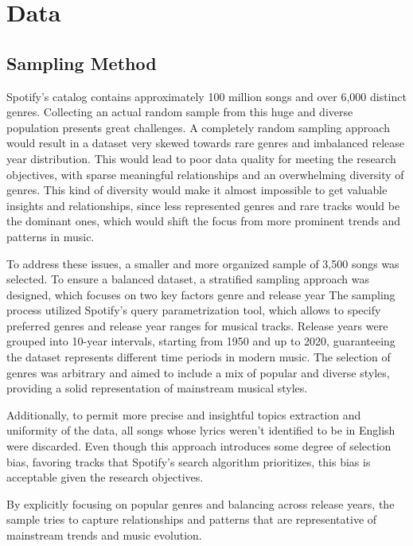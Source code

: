 \chapter{Data}
\label{cha:data}



\section{Sampling Method}
\label{sec:samplingmethod}

Spotify’s catalog contains approximately 100 million songs and over 6,000 distinct genres.
Collecting an actual random sample from this huge and diverse population presents great
challenges. A completely random sampling approach would result in a dataset very
skewed towards rare genres and imbalanced release year distribution. This would lead to
poor data quality for meeting the research objectives, with sparse meaningful relationships
and an overwhelming diversity of genres.
This kind of diversity would make it almost impossible to get valuable insights and relationships, since less represented genres and rare tracks would be the dominant ones, which would shift the focus from more prominent trends and patterns in music.


To address these issues, a smaller and more organized sample of 3,500 songs was
selected. To ensure a balanced dataset, a stratified sampling approach was designed, which focuses on two key factors genre and release year The sampling process utilized Spotify’s query parametrization tool, which allows to specify preferred genres and release
year ranges for musical tracks. Release years were grouped into 10-year intervals, starting
from 1950 and up to 2020, guaranteeing the dataset represents different time periods in
modern music. The selection of genres was arbitrary and aimed to include a mix of popular
and diverse styles, providing a solid representation of mainstream musical styles.


Additionally, to permit more precise and insightful topics extraction and uniformity of the data, all songs whose lyrics weren’t identified to be in English were discarded.
Even though this approach introduces some degree of selection bias, favoring tracks that
Spotify’s search algorithm prioritizes, this bias is acceptable given the research objectives.


By explicitly focusing on popular genres and balancing across release years, the sample tries
to capture relationships and patterns that are representative of mainstream trends and music
evolution.

